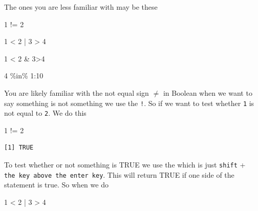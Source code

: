\documentclass[
  letterpaper,
  DIV=11,
  numbers=noendperiod,
  oneside]{scrreprt}
\newenvironment{Shaded}{\begin{snugshade}}{\end{snugshade}}
\newcommand{\DecValTok}[1]{\textcolor[rgb]{0.68,0.00,0.00}{#1}}
\newcommand{\SpecialCharTok}[1]{\textcolor[rgb]{0.37,0.37,0.37}{#1}}
\begin{document}

The ones you are less familiar with may be these

\begin{Shaded}
\begin{Highlighting}[]
\DecValTok{1} \SpecialCharTok{!=} \DecValTok{2}

\DecValTok{1} \SpecialCharTok{\textless{}} \DecValTok{2} \SpecialCharTok{|} \DecValTok{3} \SpecialCharTok{\textgreater{}} \DecValTok{4}

\DecValTok{1} \SpecialCharTok{\textless{}} \DecValTok{2} \SpecialCharTok{\&} \DecValTok{3}\SpecialCharTok{\textgreater{}}\DecValTok{4}

\DecValTok{4} \SpecialCharTok{\%in\%} \DecValTok{1}\SpecialCharTok{:}\DecValTok{10}
\end{Highlighting}
\end{Shaded}

You are likely familiar with the not equal sign \(\neq\) in Boolean when
we want to say something is not something we use the \texttt{!}. So if
we want to test whether \texttt{1} is not equal to \texttt{2}. We do
this

\begin{Shaded}
\begin{Highlighting}[]
\DecValTok{1} \SpecialCharTok{!=} \DecValTok{2} 
\end{Highlighting}
\end{Shaded}

\begin{verbatim}
[1] TRUE
\end{verbatim}

To test whether or not something is TRUE we use the \texttt{\textbar{}}
which is just \texttt{shift} +
\texttt{the\ key\ above\ the\ enter\ key}. This will return TRUE if one
side of the statement is true. So when we do

\begin{Shaded}
\begin{Highlighting}[]
\DecValTok{1} \SpecialCharTok{\textless{}} \DecValTok{2} \SpecialCharTok{|} \DecValTok{3} \SpecialCharTok{\textgreater{}} \DecValTok{4}
\end{Highlighting}
\end{Shaded}
\end{document}
